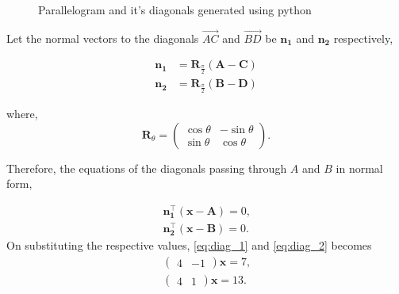 \documentclass[journal,12pt,twocolumn]{IEEEtran}
\let\vec\mathbf
\newcommand{\myvec}[1]{\ensuremath{\begin{pmatrix}#1\end{pmatrix}}}
\providecommand{\brak}[1]{\ensuremath{\left(#1\right)}}
\begin{document}
\begin{figure}[h]
\centering
\def\figwidth{\linewidth}
\def\figheight{0.25\textheight} %

\caption{Parallelogram and it's diagonals generated using python}
\end{figure}


\newpage

Let the normal vectors to the diagonals $\overrightarrow{AC}$ and $\overrightarrow{BD}$ be $\vec{n_1}$ and $\vec{n_2}$ respectively,

\begin{align}
	\vec{n_1} &= \vec{R}_{\frac{\pi}{2}} \brak{\vec{A-C}} \\
	\vec{n_2} &= \vec{R}_{\frac{\pi}{2}} \brak{\vec{B-D}}
\end{align}

where, \[ \vec{R}_{\theta} = \myvec{\cos  \theta & -\sin \theta \\ \sin \theta & \cos \theta} \text{.} \]

Therefore, the equations of the diagonals passing through $A$ and $B$ in normal form, 

\begin{align}
		\vec{n_1^{\top}}\brak{{\vec{x}-\vec{A}}} = 0\text{,} \label{eq:diag_1}\\
		\vec{n_2^{\top}}\brak{{\vec{x}-\vec{B}}} = 0\text{.} \label{eq:diag_2}
\end{align}
On substituting the respective values, \eqref{eq:diag_1} and \eqref{eq:diag_2} becomes
\begin{align*}
	\myvec{4&-1}\vec{x} = 7 \text{,}\\
	\myvec{4&1}\vec{x} = 13 \text{.}
\end{align*}
%

\end{document}
